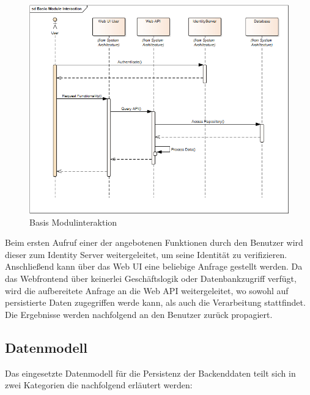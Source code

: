 \begin{figure}[h]
  \begin{center}
    \includegraphics[width=\textwidth]{./img/BackendModuleInteraction.png}
    \caption{Basis Modulinteraktion}
    \label{fig:backendModuleInteraction}
  \end{center}
\end{figure}

Beim ersten Aufruf einer der angebotenen Funktionen durch den Benutzer wird dieser zum Identity Server weitergeleitet, um seine Identität zu verifizieren. Anschließend kann über das Web UI eine beliebige Anfrage gestellt werden. Da das Webfrontend über keinerlei Geschäftslogik oder Datenbankzugriff verfügt, wird die aufbereitete Anfrage an die Web API weitergeleitet, wo sowohl auf persistierte Daten zugegriffen werde kann, als auch die Verarbeitung stattfindet. Die Ergebnisse werden nachfolgend an den Benutzer zurück propagiert. 

\subsection{Datenmodell}
Das eingesetzte Datenmodell für die Persistenz der Backenddaten teilt sich in zwei Kategorien die nachfolgend erläutert werden:

